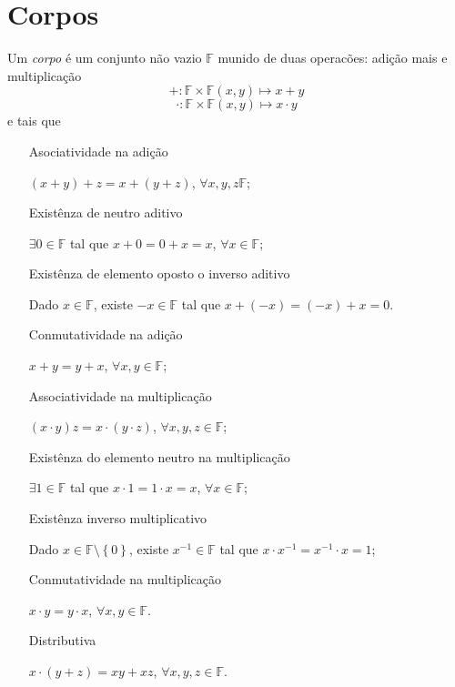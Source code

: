 \chapter{Corpos}

\begin{definition}[Corpo]
	Um \emph{corpo} é um conjunto não vazio $\mathbb{F}$ munido de duas
	operacões: adição mais e multiplicação
	\[ +\colon\mathbb{F}\times\mathbb{F}\left(x,y\right)\mapsto x+y \]
	\[ \cdot\colon\mathbb{F}\times\mathbb{F}\left(x,y\right)\mapsto x\cdot y \]
	e tais que
	\begin{enumerate}
		\item[Asociatividade na adição]

		      $\left(x+y\right)+z=x+\left(y+z\right)$, $\forall x,y,z\mathbb{F}$;

		\item[Existênza de neutro aditivo]

		      $\exists0\in\mathbb{F}$ tal que $x+0=0+x=x$, $\forall x\in\mathbb{F}$;

		\item[Existênza de elemento oposto o inverso aditivo]

		      Dado $x\in\mathbb{F}$, existe $-x\in\mathbb{F}$ tal que $x+\left(-x\right)=\left(-x\right)+x=0$.

		\item[Conmutatividade na adição]

		      $x+y=y+x$, $\forall x,y\in\mathbb{F}$;

		\item[Associatividade na multiplicação]

		      $\left(x\cdot y\right)z=x\cdot\left(y\cdot z\right)$, $\forall x,y,z\in\mathbb{F}$;

		\item[Existênza do elemento neutro na multiplicação]

		      $\exists 1\in\mathbb{F}$ tal que $x\cdot 1=1\cdot x=x$, $\forall x\in\mathbb{F}$;

		\item[Existênza inverso multiplicativo]

		      Dado $x\in\mathbb{F}\setminus\left\{0\right\}$, existe $x^{-1}\in\mathbb{F}$ tal que $x\cdot x^{-1}=x^{-1}\cdot x=1$;

		\item[Conmutatividade na multiplicação]

		      $x\cdot y=y\cdot x$, $\forall x,y\in\mathbb{F}$.

		\item[Distributiva]

		      $x\cdot\left(y+z\right)=xy+xz$, $\forall x,y,z\in\mathbb{F}$.
	\end{enumerate}
\end{definition}

